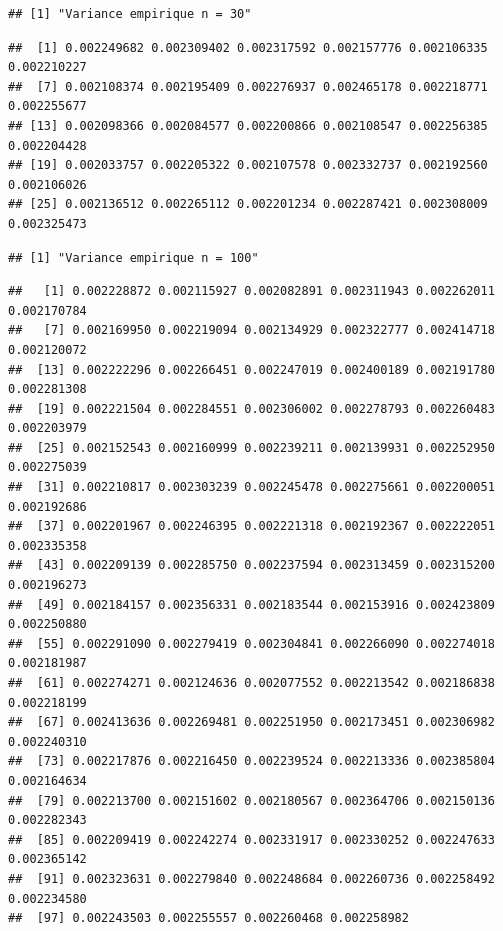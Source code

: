 \documentclass[
]{article}
\begin{document}
\begin{verbatim}
## [1] "Variance empirique n = 30"
\end{verbatim}

\begin{verbatim}
##  [1] 0.002249682 0.002309402 0.002317592 0.002157776 0.002106335 0.002210227
##  [7] 0.002108374 0.002195409 0.002276937 0.002465178 0.002218771 0.002255677
## [13] 0.002098366 0.002084577 0.002200866 0.002108547 0.002256385 0.002204428
## [19] 0.002033757 0.002205322 0.002107578 0.002332737 0.002192560 0.002106026
## [25] 0.002136512 0.002265112 0.002201234 0.002287421 0.002308009 0.002325473
\end{verbatim}

\begin{verbatim}
## [1] "Variance empirique n = 100"
\end{verbatim}

\begin{verbatim}
##   [1] 0.002228872 0.002115927 0.002082891 0.002311943 0.002262011 0.002170784
##   [7] 0.002169950 0.002219094 0.002134929 0.002322777 0.002414718 0.002120072
##  [13] 0.002222296 0.002266451 0.002247019 0.002400189 0.002191780 0.002281308
##  [19] 0.002221504 0.002284551 0.002306002 0.002278793 0.002260483 0.002203979
##  [25] 0.002152543 0.002160999 0.002239211 0.002139931 0.002252950 0.002275039
##  [31] 0.002210817 0.002303239 0.002245478 0.002275661 0.002200051 0.002192686
##  [37] 0.002201967 0.002246395 0.002221318 0.002192367 0.002222051 0.002335358
##  [43] 0.002209139 0.002285750 0.002237594 0.002313459 0.002315200 0.002196273
##  [49] 0.002184157 0.002356331 0.002183544 0.002153916 0.002423809 0.002250880
##  [55] 0.002291090 0.002279419 0.002304841 0.002266090 0.002274018 0.002181987
##  [61] 0.002274271 0.002124636 0.002077552 0.002213542 0.002186838 0.002218199
##  [67] 0.002413636 0.002269481 0.002251950 0.002173451 0.002306982 0.002240310
##  [73] 0.002217876 0.002216450 0.002239524 0.002213336 0.002385804 0.002164634
##  [79] 0.002213700 0.002151602 0.002180567 0.002364706 0.002150136 0.002282343
##  [85] 0.002209419 0.002242274 0.002331917 0.002330252 0.002247633 0.002365142
##  [91] 0.002323631 0.002279840 0.002248684 0.002260736 0.002258492 0.002234580
##  [97] 0.002243503 0.002255557 0.002260468 0.002258982
\end{verbatim}
\end{document}
